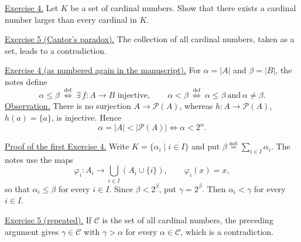 \medskip
\noindent\underline{Exercise 4.}
Let $K$ be a set of cardinal numbers. Show that there exists a
cardinal number larger than every cardinal in $K$.

\smallskip
\noindent\underline{Exercise 5 (Cantor's paradox).}
The collection of all cardinal numbers, taken as a set, leads to a
contradiction.

\smallskip
\noindent\underline{Exercise 4 (as numbered again in the manuscript).}
For $\alpha=|A|$ and $\beta=|B|$, the notes define
\[
 \alpha\leq\beta\ \overset{\mathrm{def}}{\iff}\
 \exists\,f:A\longrightarrow B\text{ injective},
 \qquad
 \alpha<\beta\ \overset{\mathrm{def}}{\iff}\
 \alpha\leq\beta\ \text{and}\ \alpha\neq\beta.
\]
\noindent\underline{Observation.}
There is no surjection $A\longrightarrow\mathcal P(A)$, whereas
$h:A\longrightarrow\mathcal P(A)$, $h(a)=\{a\}$, is injective. Hence
\[
 \alpha=|A|<|\mathcal P(A)|\iff\alpha<2^{\alpha}.
\]

\noindent\underline{Proof of the first Exercise 4.}
Write $K=\{\alpha_i\mid i\in I\}$ and put
$\beta\overset{\mathrm{not}}{=}\sum_{i\in I}\alpha_i$.
The notes use the maps
\[
 \varphi_i:A_i\longrightarrow\bigcup_{i\in I}(A_i\cup\{i\}),
 \qquad\varphi_i(x)=x,
\]
so that $\alpha_i\leq\beta$ for every $i\in I$. Since $\beta<2^{\beta}$, put $\gamma=2^{\beta}$. Then
$\alpha_i<\gamma$ for every $i\in I$.

\noindent\underline{Exercise 5 (repeated).}
If $\mathcal C$ is the set of all cardinal numbers, the preceding
argument gives $\gamma\in\mathcal C$ with $\gamma>\alpha$ for
every $\alpha\in\mathcal C$, which is a contradiction.
\endgroup
